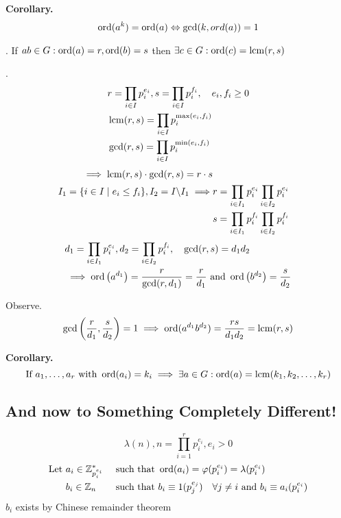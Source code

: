 \textbf{Corollary.}
\begin{align*}
  \operatorname{ord}(a^k) = \operatorname{ord}(a) \Leftrightarrow \gcd(k, ord(a)) = 1
\end{align*}

\Theorem.
If $ab \in G: \operatorname{ord}(a)=r, \operatorname{ord}(b) = s$ then $\exists c \in G: \operatorname{ord}(c) = \operatorname{lcm}(r,s)$

\Proof.
\begin{align*}
  &r = \prod_{i\in I} p_i^{e_i}, s = \prod_{i\in I} p_i^{f_i}, \quad  e_i, f_i \geq 0\\
  &\operatorname{lcm}(r,s) = \prod_{i\in I} p_i^{\max(e_i,f_i)}\\
  &\gcd(r,s) = \prod_{i\in I} p_i^{\min(e_i,f_i)}
\end{align*}
\begin{align*}
  \implies \operatorname{lcm}(r,s) \cdot \gcd(r,s) = r \cdot s\\
  I_1 = \{i \in I \mid e_i \leq f_i\}, I_2 = I \backslash I_1
  \implies
     & r = \prod_{i\in I_1} p_i^{e_i} \prod_{i\in I_2} p_i^{e_i} \\
     & s = \prod_{i\in I_1} p_i^{f_i} \prod_{i\in I_2} p_i^{f_i} \\
\end{align*}
\begin{align*}
  &d_1 = \prod_{i\in I_1} p_i^{e_i}, d_2 = \prod_{i\in I_2} p_i^{f_i}, \quad \gcd(r,s) = d_1 d_2 \\
  &\implies \operatorname{ord}\left(a^{d_1}\right) = \frac{r}{\gcd(r,d_1)} = \frac{r}{d_1} \text{ and } \operatorname{ord}\left(b^{d_2}\right) = \frac{s}{d_2}
\end{align*}

Observe.
\begin{align*}
  \gcd\left(\frac{r}{d_1}, \frac{s}{d_2} \right) = 1
    \implies \operatorname{ord}(a^{d_1} b^{d_2}) =
    \frac{rs}{d_1 d_2} = \operatorname{lcm}(r,s)
\end{align*}

\textbf{Corollary.}
\[
  \text{If } a_1, \ldots, a_r \text{ with } \operatorname{ord}(a_i) = k_i
  \implies \exists a \in G: \operatorname{ord}(a) = \operatorname{lcm}(k_1, k_2, \ldots, k_r)
\]

\subsection{And now to Something Completely Different!}

\[
  \lambda(n), n = \prod_{i = 1}^{r} p_i^{e_i}, e_i > 0
\]
\begin{alignat*}{2}
\text{Let } &a_i \in \mathbb{Z}_{p_i^{e_i}}^{*} &&\text{ such that } \operatorname{ord}(a_i) = \varphi(p_i^{e_i}) = \lambda(p_i^{e_i})\\
  &b_i \in \mathbb{Z}_n &&\text{ such that } b_i \equiv 1 (p_j^{e_j}) \quad \forall j \neq i \text{ and } b_i \equiv a_i (p_i^{e_i})
\end{alignat*}
$b_i$ exists by Chinese remainder theorem

